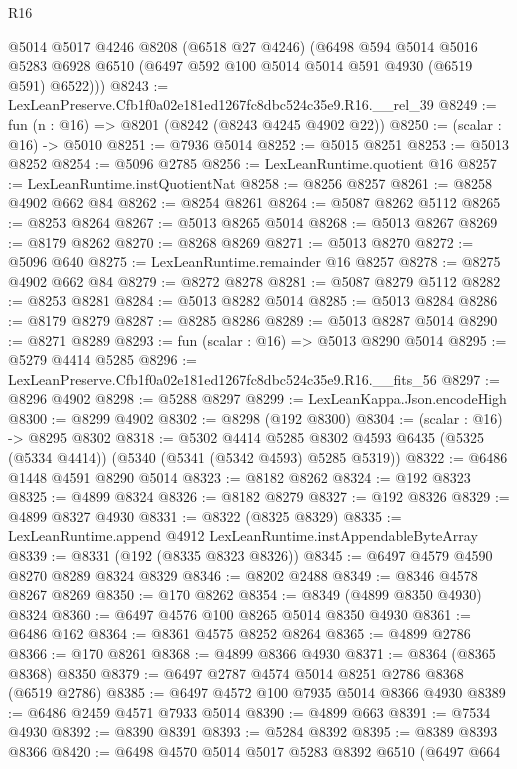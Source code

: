 \begin{lexlean}{R16}
\begin{coremodule}
      @5014
      @5017
      @4246
      @8208
      (@6518 @27 @4246)
      (@6498
        @594
        @5014
        @5016
        @5283
        @6928
        @6510
        (@6497 @592 @100 @5014 @5014 @591 @4930 (@6519 @591) @6522)))
@8243 := LexLeanPreserve.Cfb1f0a02e181ed1267fc8dbc524c35e9.R16.__rel_39
@8249 := fun (n : @16) => @8201 (@8242 (@8243 @4245 @4902 @22))
@8250 := (scalar : @16) -> @5010
@8251 := @7936 @5014
@8252 := @5015 @8251
@8253 := @5013 @8252
@8254 := @5096 @2785
@8256 := LexLeanRuntime.quotient @16
@8257 := LexLeanRuntime.instQuotientNat
@8258 := @8256 @8257
@8261 := @8258 @4902 @662 @84
@8262 := @8254 @8261
@8264 := @5087 @8262 @5112
@8265 := @8253 @8264
@8267 := @5013 @8265 @5014
@8268 := @5013 @8267
@8269 := @8179 @8262
@8270 := @8268 @8269
@8271 := @5013 @8270
@8272 := @5096 @640
@8275 := LexLeanRuntime.remainder @16 @8257
@8278 := @8275 @4902 @662 @84
@8279 := @8272 @8278
@8281 := @5087 @8279 @5112
@8282 := @8253 @8281
@8284 := @5013 @8282 @5014
@8285 := @5013 @8284
@8286 := @8179 @8279
@8287 := @8285 @8286
@8289 := @5013 @8287 @5014
@8290 := @8271 @8289
@8293 := fun (scalar : @16) => @5013 @8290 @5014
@8295 := @5279 @4414 @5285
@8296 := LexLeanPreserve.Cfb1f0a02e181ed1267fc8dbc524c35e9.R16.__fits_56
@8297 := @8296 @4902
@8298 := @5288 @8297
@8299 := LexLeanKappa.Json.encodeHigh
@8300 := @8299 @4902
@8302 := @8298 (@192 @8300)
@8304 := (scalar : @16) -> @8295 @8302
@8318 := @5302
    @4414
    @5285
    @8302
    @4593
    @6435
    (@5325 (@5334 @4414))
    (@5340 (@5341 (@5342 @4593) @5285 @5319))
@8322 := @6486 @1448 @4591 @8290 @5014
@8323 := @8182 @8262
@8324 := @192 @8323
@8325 := @4899 @8324
@8326 := @8182 @8279
@8327 := @192 @8326
@8329 := @4899 @8327 @4930
@8331 := @8322 (@8325 @8329)
@8335 := LexLeanRuntime.append @4912 LexLeanRuntime.instAppendableByteArray
@8339 := @8331 (@192 (@8335 @8323 @8326))
@8345 := @6497 @4579 @4590 @8270 @8289 @8324 @8329
@8346 := @8202 @2488
@8349 := @8346 @4578 @8267 @8269
@8350 := @170 @8262
@8354 := @8349 (@4899 @8350 @4930) @8324
@8360 := @6497 @4576 @100 @8265 @5014 @8350 @4930
@8361 := @6486 @162
@8364 := @8361 @4575 @8252 @8264
@8365 := @4899 @2786
@8366 := @170 @8261
@8368 := @4899 @8366 @4930
@8371 := @8364 (@8365 @8368) @8350
@8379 := @6497 @2787 @4574 @5014 @8251 @2786 @8368 (@6519 @2786)
@8385 := @6497 @4572 @100 @7935 @5014 @8366 @4930
@8389 := @6486 @2459 @4571 @7933 @5014
@8390 := @4899 @663
@8391 := @7534 @4930
@8392 := @8390 @8391
@8393 := @5284 @8392
@8395 := @8389 @8393 @8366
@8420 := @6498
    @4570
    @5014
    @5017
    @5283
    @8392
    @6510
    (@6497
      @664

\end{coremodule}
\end{lexlean}
